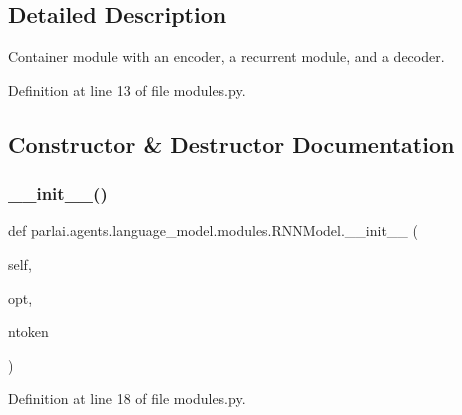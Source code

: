 \subsection{Detailed Description}
\begin{DoxyVerb}Container module with an encoder, a recurrent module, and a decoder.
\end{DoxyVerb}
 

Definition at line 13 of file modules.\+py.



\subsection{Constructor \& Destructor Documentation}
\mbox{\label{classparlai_1_1agents_1_1language__model_1_1modules_1_1RNNModel_ac96297bc86b58ccebf74b151e27e7d75}} 
\subsubsection{\texorpdfstring{\+\_\+\+\_\+init\+\_\+\+\_\+()}{\_\_init\_\_()}}
{\footnotesize\ttfamily def parlai.\+agents.\+language\+\_\+model.\+modules.\+R\+N\+N\+Model.\+\_\+\+\_\+init\+\_\+\+\_\+ (\begin{DoxyParamCaption}\item[{}]{self,  }\item[{}]{opt,  }\item[{}]{ntoken }\end{DoxyParamCaption})}



Definition at line 18 of file modules.\+py.


